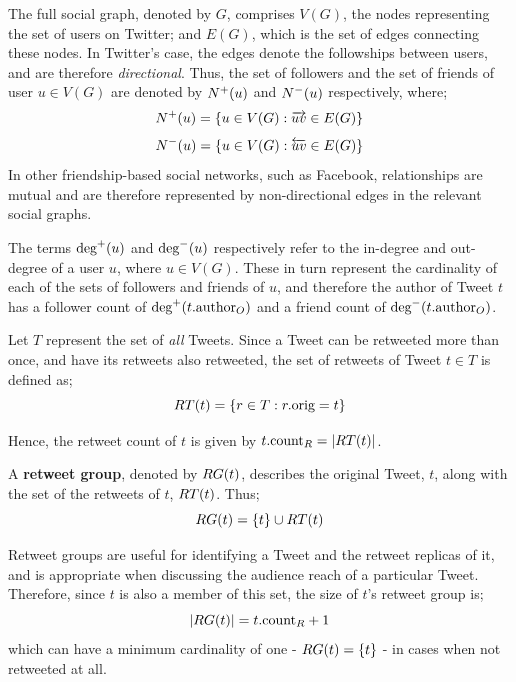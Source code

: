 The full social graph, denoted by $G$, comprises $V(G)$, the nodes representing the set of users on Twitter; and $E(G)$, which is the set of edges connecting these nodes. In Twitter's case, the edges denote the followships between users, and are therefore \textit{directional}. Thus, the set of followers and the set of friends of user $u \in V(G)$ are denoted by $N^+(u)$ and $N^-(u)$ respectively, where;
\[
    N^+(u) = \left\{u \in V(G) :  \overrightarrow{u v} \in E(G)\right\}
\]
\[
    N^-(u) = \left\{u \in V(G) :  \overleftarrow{u v} \in E(G)\right\}
\]
In other friendship-based social networks, such as Facebook, relationships are mutual and are therefore represented by non-directional edges in the relevant social graphs.

The terms $\textrm{deg}^+(u)$ and $\textrm{deg}^-(u)$ respectively refer to the in-degree and out-degree of a user $u$, where $u \in V(G)$. These in turn represent the cardinality of each of the sets of followers and friends of $u$, and therefore the author of Tweet $t$ has a follower count of $\textrm{deg}^+(t.\textrm{author}_O)$ and a friend count of $\textrm{deg}^-(t.\textrm{author}_O)$.

Let $T$ represent the set of \textit{all} Tweets. Since a Tweet can be retweeted more than once, and have its retweets also retweeted, the set of retweets of Tweet $t \in T$ is defined as;
\[
    RT(t) = \left\{ r \in T : r.\textrm{orig} = t \right\}
\]

Hence, the retweet count of $t$ is given by $ t.\textrm{count}_R = \left\vert{RT(t)}\right\vert $.


\begin{mydefinition}
\label{definition:retweet_group}
A \textbf{retweet group}, denoted by $RG(t)$, describes the original Tweet, $t$, along with the set of the retweets of $t$, $RT(t)$. Thus;
\[
    RG(t) = \left\{t\right\} \cup RT(t)
\]
\end{mydefinition}


Retweet groups are useful for identifying a Tweet and the retweet replicas of it, and is appropriate when discussing the audience reach of a particular Tweet. Therefore, since $t$ is also a member of this set, the size of $t$'s retweet group is; 
\[
	\left\vert{
RG(t)}\right\vert = t.\textrm{count}_R + 1 
\] 
which can have a minimum cardinality of one - $RG(t) = \left\{t\right\}$ - in cases when not retweeted at all.
 

